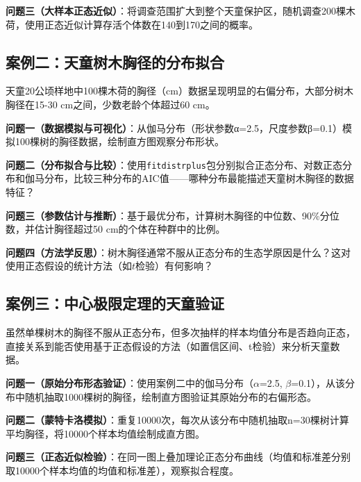 \documentclass[
  twoside,12pt,fontset=none]{ctexbook}
\begin{document}
\textbf{问题三（大样本正态近似）}：将调查范围扩大到整个天童保护区，随机调查200棵木荷，使用正态近似计算存活个体数在140到170之间的概率。

\hypertarget{ux6848ux4f8bux4e8cux5929ux7ae5ux6811ux6728ux80f8ux5f84ux7684ux5206ux5e03ux62dfux5408}{%
\subsection{案例二：天童树木胸径的分布拟合}\label{ux6848ux4f8bux4e8cux5929ux7ae5ux6811ux6728ux80f8ux5f84ux7684ux5206ux5e03ux62dfux5408}}

天童20公顷样地中100棵木荷的胸径（cm）数据呈现明显的右偏分布，大部分树木胸径在15-30 cm之间，少数老龄个体超过60 cm。

\textbf{问题一（数据模拟与可视化）}：从伽马分布（形状参数α=2.5，尺度参数β=0.1）模拟100棵树的胸径数据，绘制直方图观察分布形状。

\textbf{问题二（分布拟合与比较）}：使用\texttt{fitdistrplus}包分别拟合正态分布、对数正态分布和伽马分布，比较三种分布的AIC值------哪种分布最能描述天童树木胸径的数据特征？

\textbf{问题三（参数估计与推断）}：基于最优分布，计算树木胸径的中位数、90\%分位数，并估计胸径超过50 cm的个体在种群中的比例。

\textbf{问题四（方法学反思）}：树木胸径通常不服从正态分布的生态学原因是什么？这对使用正态假设的统计方法（如\(t\)检验）有何影响？

\hypertarget{ux6848ux4f8bux4e09ux4e2dux5fc3ux6781ux9650ux5b9aux7406ux7684ux5929ux7ae5ux9a8cux8bc1}{%
\subsection{案例三：中心极限定理的天童验证}\label{ux6848ux4f8bux4e09ux4e2dux5fc3ux6781ux9650ux5b9aux7406ux7684ux5929ux7ae5ux9a8cux8bc1}}

虽然单棵树木的胸径不服从正态分布，但多次抽样的样本均值分布是否趋向正态，直接关系到能否使用基于正态假设的方法（如置信区间、t检验）来分析天童数据。

\textbf{问题一（原始分布形态验证）}：使用案例二中的伽马分布（\(\alpha\)=2.5, \(\beta\)=0.1），从该分布中随机抽取1000棵树的胸径，绘制直方图验证其原始分布的右偏形态。

\textbf{问题二（蒙特卡洛模拟）}：重复10000次，每次从该分布中随机抽取n=30棵树计算平均胸径，将10000个样本均值绘制成直方图。

\textbf{问题三（正态近似检验）}：在同一图上叠加理论正态分布曲线（均值和标准差分别取10000个样本均值的均值和标准差），观察拟合程度。
\end{document}

